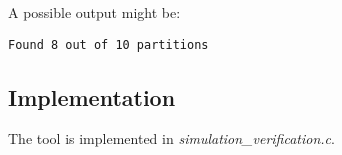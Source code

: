 A possible output might be:
\begin{lstlisting}
Found 8 out of 10 partitions
\end{lstlisting}

\subsection{Implementation}
The tool is implemented in \emph{simulation\_verification.c}.
